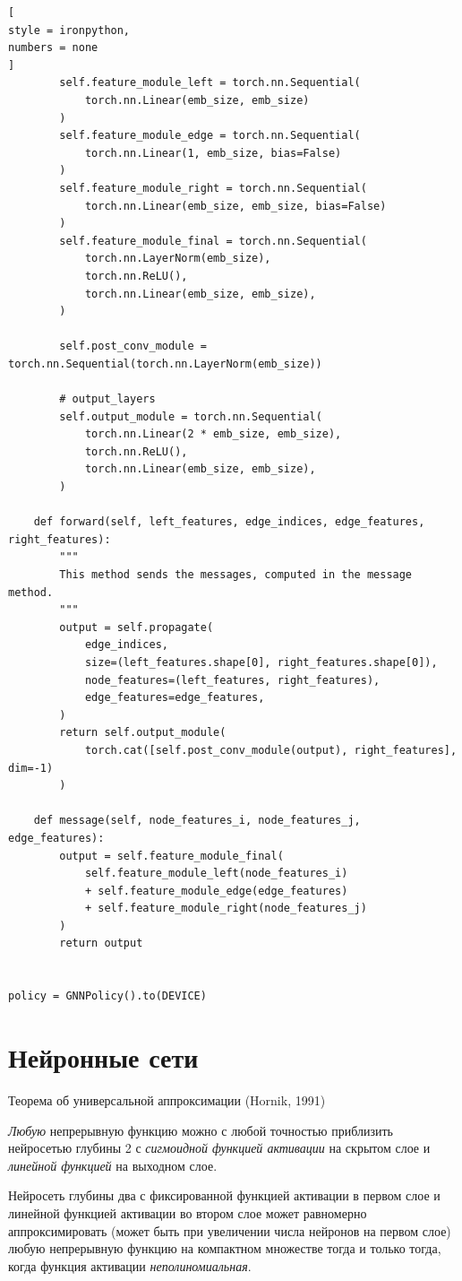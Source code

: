\documentclass[%
	11pt,
	a4paper,
	utf8,
		]{article}
\begin{document}
\begin{lstlisting}[
style = ironpython,
numbers = none
]
		self.feature_module_left = torch.nn.Sequential(
			torch.nn.Linear(emb_size, emb_size)
		)
		self.feature_module_edge = torch.nn.Sequential(
			torch.nn.Linear(1, emb_size, bias=False)
		)
		self.feature_module_right = torch.nn.Sequential(
			torch.nn.Linear(emb_size, emb_size, bias=False)
		)
		self.feature_module_final = torch.nn.Sequential(
			torch.nn.LayerNorm(emb_size),
			torch.nn.ReLU(),
			torch.nn.Linear(emb_size, emb_size),
		)
		
		self.post_conv_module = torch.nn.Sequential(torch.nn.LayerNorm(emb_size))
		
		# output_layers
		self.output_module = torch.nn.Sequential(
			torch.nn.Linear(2 * emb_size, emb_size),
			torch.nn.ReLU(),
			torch.nn.Linear(emb_size, emb_size),
		)

	def forward(self, left_features, edge_indices, edge_features, right_features):
		"""
		This method sends the messages, computed in the message method.
		"""
		output = self.propagate(
			edge_indices,
			size=(left_features.shape[0], right_features.shape[0]),
			node_features=(left_features, right_features),
			edge_features=edge_features,
		)
		return self.output_module(
			torch.cat([self.post_conv_module(output), right_features], dim=-1)
		)

	def message(self, node_features_i, node_features_j, edge_features):
		output = self.feature_module_final(
			self.feature_module_left(node_features_i)
			+ self.feature_module_edge(edge_features)
			+ self.feature_module_right(node_features_j)
		)
		return output


policy = GNNPolicy().to(DEVICE)
\end{lstlisting}




\section{Нейронные сети}

Теорема об универсальной аппроксимации (Hornik, 1991)

\emph{Любую} непрерывную функцию можно с любой точностью приблизить нейросетью глубины 2 с \emph{сигмоидной функцией активации} на скрытом слое и \emph{линейной функцией} на выходном слое.

Нейросеть глубины два с фиксированной функцией активации в первом слое и линейной функцией активации во втором слое может равномерно аппроксимировать (может быть при увеличении числа нейронов на первом слое) любую непрерывную функцию на компактном множестве тогда и только тогда, когда функция активации \emph{неполиномиальная}.
\end{document}
